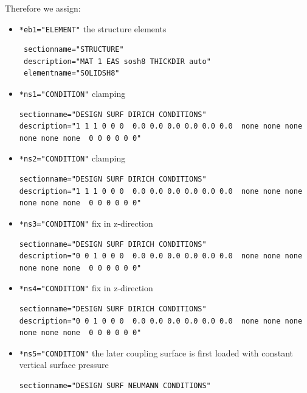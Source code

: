 Therefore we assign:
\begin{itemize}
 \item \verb|*eb1="ELEMENT"| \qquad the structure elements
 \begin{small} \begin{verbatim}
 sectionname="STRUCTURE"
 description="MAT 1 EAS sosh8 THICKDIR auto"
 elementname="SOLIDSH8"
 \end{verbatim} \end{small}
 \item \verb|*ns1="CONDITION"| \qquad clamping
 \begin{small} \begin{verbatim}
sectionname="DESIGN SURF DIRICH CONDITIONS"
description="1 1 1 0 0 0  0.0 0.0 0.0 0.0 0.0 0.0  none none none none none none  0 0 0 0 0 0"
 \end{verbatim} \end{small}
 \item \verb|*ns2="CONDITION"| \qquad clamping
 \begin{small} \begin{verbatim}
sectionname="DESIGN SURF DIRICH CONDITIONS"
description="1 1 1 0 0 0  0.0 0.0 0.0 0.0 0.0 0.0  none none none none none none  0 0 0 0 0 0"
 \end{verbatim} \end{small}
 \item \verb|*ns3="CONDITION"| \qquad fix in z-direction
 \begin{small} \begin{verbatim}
sectionname="DESIGN SURF DIRICH CONDITIONS"
description="0 0 1 0 0 0  0.0 0.0 0.0 0.0 0.0 0.0  none none none none none none  0 0 0 0 0 0"
 \end{verbatim} \end{small}
 \item \verb|*ns4="CONDITION"| \qquad fix in z-direction
 \begin{small} \begin{verbatim}
sectionname="DESIGN SURF DIRICH CONDITIONS"
description="0 0 1 0 0 0  0.0 0.0 0.0 0.0 0.0 0.0  none none none none none none  0 0 0 0 0 0"
 \end{verbatim} \end{small}
 \item \verb|*ns5="CONDITION"| \qquad the later coupling surface is first loaded with constant vertical surface pressure
 \begin{small} \begin{verbatim}
sectionname="DESIGN SURF NEUMANN CONDITIONS"

\end{verbatim}
\end{small}
\end{itemize}
